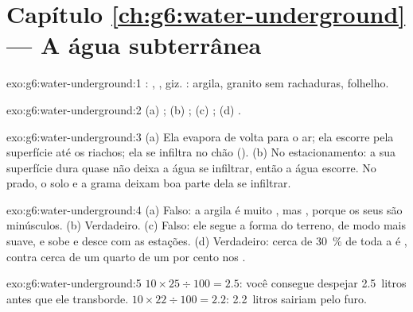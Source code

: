 \section*{Capítulo \ref{ch:g6:water-underground} --- A água subterrânea}

\begin{solution}{exo:g6:water-underground:1}
: , , giz. : argila, granito sem
rachaduras, folhelho.
\end{solution}

\begin{solution}{exo:g6:water-underground:2}
(a) ; (b) ; (c) ; (d) .
\end{solution}

\begin{solution}{exo:g6:water-underground:3}
(a) Ela evapora de volta para o ar; ela escorre pela superfície até os
riachos; ela se infiltra no chão (). (b) No estacionamento: a
sua superfície dura quase não deixa a água se infiltrar, então a água
escorre. No prado, o solo e a grama deixam boa parte dela se infiltrar.
\end{solution}

\begin{solution}{exo:g6:water-underground:4}
(a) Falso: a argila é muito , mas , porque os seus 
são minúsculos. (b) Verdadeiro. (c) Falso: ele segue a forma do terreno, de
modo mais suave, e sobe e desce com as estações. (d) Verdadeiro: cerca de
30~\% de toda a  é , contra cerca de um quarto de
um por cento nos .
\end{solution}

\begin{solution}{exo:g6:water-underground:5}
$10 \times 25 \div 100 = 2.5$: você consegue despejar 2.5~litros antes que
ele transborde. $10 \times 22 \div 100 = 2.2$: 2.2~litros sairiam pelo furo.
\end{solution}

